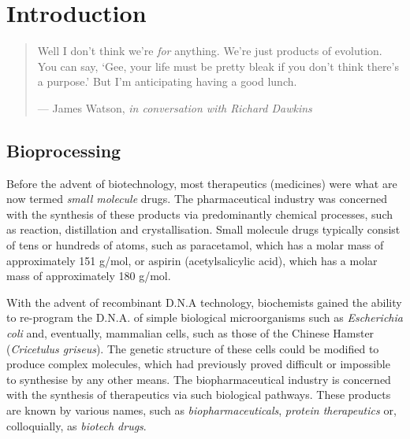 %
%
%
%

\chapter{Introduction}\label{C.intro}

\begin{quote}
Well I don't think we're \emph{for} anything. We're just products of evolution.
You can say, `Gee, your life must be pretty bleak if you don't think there's a
purpose.' But I'm anticipating having a good lunch.

\hspace{2cm}--- James Watson, \emph{in conversation with Richard Dawkins}
\end{quote}

\section{Bioprocessing}\label{SS.bioproc}

Before the advent of biotechnology, most therapeutics (medicines) were what are
now termed \emph{small molecule} drugs.
The pharmaceutical industry was concerned with the synthesis of these products
via predominantly chemical processes, such as reaction, distillation and 
crystallisation.
Small molecule drugs typically consist of tens or hundreds of atoms, such as
paracetamol, which has a molar mass of approximately 151 g/mol, or aspirin
(acetylsalicylic acid), which has a molar mass of approximately 180 g/mol.

With the advent of recombinant D.N.A technology, biochemists gained the ability
to re-program the D.N.A. of simple biological microorganisms such as
\textit{Escherichia coli} and, eventually, mammalian cells, such as those of
the Chinese Hamster (\textit{Cricetulus griseus}).
The genetic structure of these cells could be modified to produce complex
molecules, which had previously proved difficult or impossible to synthesise by
any other means.
The biopharmaceutical industry is concerned with the synthesis of therapeutics
via such biological pathways.
These products are known by various names, such as
\emph{biopharmaceuticals}, \emph{protein therapeutics} or, colloquially, as
\emph{biotech drugs}.

